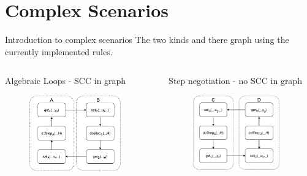 \documentclass{beamer}
\begin{document}
\section{Complex Scenarios}

\begin{frame}{Introduction to complex scenarios}
    The two kinds and there graph using the currently implemented rules.
    \begin{columns}[T] 
        \begin{column}{.48\textwidth}
            Algebraic Loops - SCC in graph
            \begin{figure}    
                \includegraphics[width=0.9\textwidth]{images/reactive_step_graph.pdf}
            \end{figure}  
        \end{column}
    \hfill%
    \begin{column}{.48\textwidth}
        Step negotiation - no SCC in graph
        \begin{figure}    
            \centering
            \includegraphics[width=0.9\textwidth]{images/step_scenario_original.pdf}
        \end{figure}
    \end{column}
    \end{columns}
\end{frame}
\end{document}
